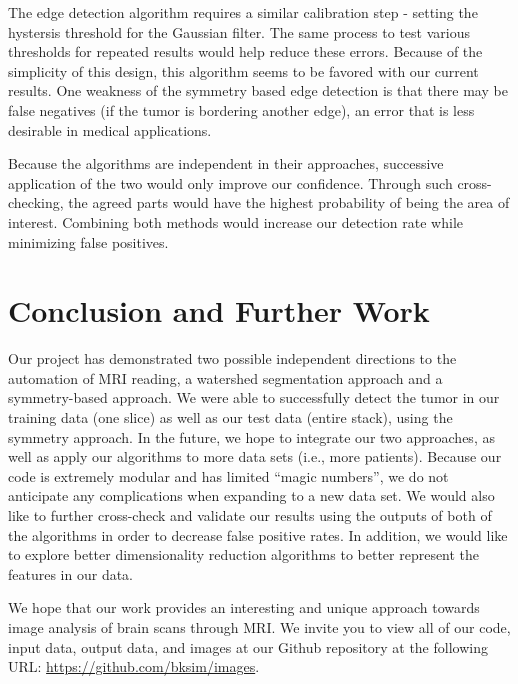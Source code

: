 \documentclass[12pt]{article}
\theoremstyle{plain}%
\theoremstyle{definition}
\theoremstyle{remark}
\begin{document}
The edge detection algorithm requires a similar calibration step - setting the hystersis threshold for the Gaussian filter.  The same process to test various thresholds for repeated results would help reduce these errors.  Because of the simplicity of this design, this algorithm seems to be favored with our current results.  One weakness of the symmetry based edge detection is that there may be false negatives (if the tumor is bordering another edge), an error that is less desirable in medical applications.

Because the algorithms are independent in their approaches, successive application of the two would only improve our confidence.  Through such cross-checking, the agreed parts would have the highest probability of being the area of interest.  Combining both methods would increase our detection rate while minimizing false positives.

\section{Conclusion and Further Work}

Our project has demonstrated two possible independent directions to the automation of MRI reading, a watershed segmentation approach and a symmetry-based approach. We were able to successfully detect the tumor in our training data (one slice) as well as our test data (entire stack), using the symmetry approach. In the future, we hope to integrate our two approaches, as well as apply our algorithms to more data sets (i.e., more patients). Because our code is extremely modular and has limited ``magic numbers'', we do not anticipate any complications when expanding to a new data set. We would also like to further cross-check and validate our results using the outputs of both of the algorithms in order to decrease false positive rates. In addition, we would like to explore better dimensionality reduction algorithms to better represent the features in our data.

We hope that our work provides an interesting and unique approach towards image analysis of brain scans through MRI. We invite you to view all of our code, input data, output data, and images at our Github repository at the following URL: \url{https://github.com/bksim/images}.
\end{document}
